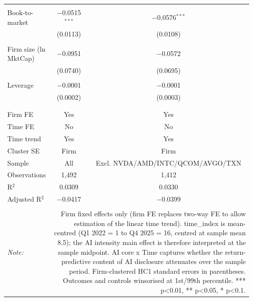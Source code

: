 \begin{table}[!htbp]
\begin{tabular}{@{\extracolsep{5pt}}lcc}
  & & \\ 
 Book-to-market & $-$0.0515$^{***}$ & $-$0.0576$^{***}$ \\ 
  & (0.0113) & (0.0108) \\ 
  & & \\ 
 Firm size (ln MktCap) & $-$0.0951 & $-$0.0572 \\ 
  & (0.0740) & (0.0695) \\ 
  & & \\ 
 Leverage & $-$0.0001 & $-$0.0001 \\ 
  & (0.0002) & (0.0003) \\ 
  & & \\ 
\hline \\[-1.8ex] 
Firm FE & Yes & Yes \\ 
Time FE & No & No \\ 
Time trend & Yes & Yes \\ 
Cluster SE & Firm & Firm \\ 
Sample & All & Excl. NVDA/AMD/INTC/QCOM/AVGO/TXN \\ 
Observations & 1,492 & 1,412 \\ 
R$^{2}$ & 0.0309 & 0.0330 \\ 
Adjusted R$^{2}$ & $-$0.0417 & $-$0.0399 \\ 
\hline 
\hline \\[-1.8ex] 
\textit{Note:}  & \multicolumn{2}{r}{Firm fixed effects only (firm FE replaces two-way FE to allow estimation of the linear time trend). time_index is mean-centred (Q1 2022 = 1 to Q4 2025 = 16, centred at sample mean ~8.5); the AI intensity main effect is therefore interpreted at the sample midpoint. AI core x Time captures whether the return-predictive content of AI disclosure attenuates over the sample period. Firm-clustered HC1 standard errors in parentheses. Outcomes and controls winsorised at 1st/99th percentile. *** p<0.01, ** p<0.05, * p<0.1.} \\ 
\end{tabular} 
\end{table} 
